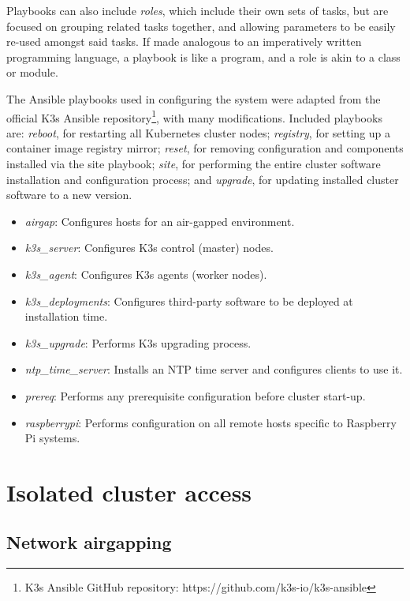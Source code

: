 Playbooks can also include \textit{roles}, which include their own sets of tasks, but are focused on grouping related tasks together, and allowing parameters to be easily re-used amongst said tasks. If made analogous to an imperatively written programming language, a playbook is like a program, and a role is akin to a class or module.


The Ansible playbooks used in configuring the system were adapted from the official K3s Ansible repository\footnote{K3s Ansible GitHub repository: https://github.com/k3s-io/k3s-ansible}, with many modifications. Included playbooks are: \textit{reboot}, for restarting all Kubernetes cluster nodes; \textit{registry}, for setting up a container image registry mirror; \textit{reset}, for removing configuration and components installed via the site playbook; \textit{site}, for performing the entire cluster software installation and configuration process; and \textit{upgrade}, for updating installed cluster software to a new version.

\begin{itemize}[itemsep=0pt]
    \item \textit{airgap}: Configures hosts for an air-gapped environment.
    \item \textit{k3s\_server}: Configures K3s control (master) nodes.
    \item \textit{k3s\_agent}: Configures K3s agents (worker nodes).
    \item \textit{k3s\_deployments}: Configures third-party software to be deployed at installation time.
    \item \textit{k3s\_upgrade}: Performs K3s upgrading process.
    \item \textit{ntp\_time\_server}: Installs an NTP time server and configures clients to use it.
    \item \textit{prereq}: Performs any prerequisite configuration before cluster start-up.
    \item \textit{raspberrypi}: Performs configuration on all remote hosts specific to Raspberry Pi systems.
\end{itemize}

\section{Isolated cluster access}

\subsection{Network airgapping}

